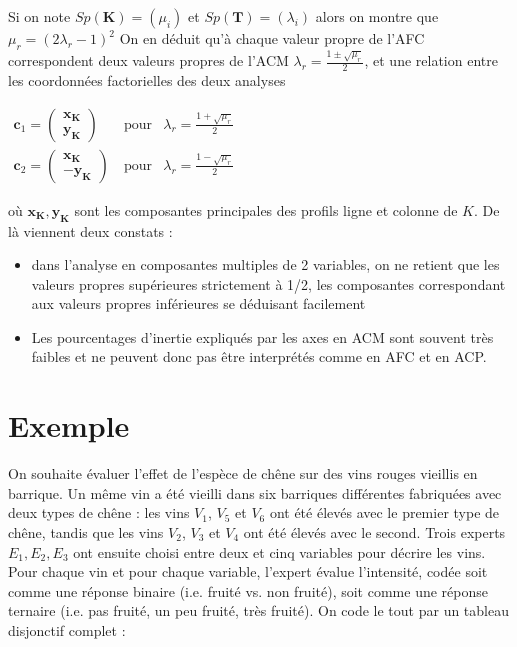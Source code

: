 \documentclass[letterpaper,10pt,english]{jupyterBook}
\begin{document}
\sphinxAtStartPar
Si on note \(Sp(\mathbf{K}) = (\mu_i)\) et \(Sp(\mathbf{T}) = (\lambda_i)\) alors on montre  que  \(\mu_r = (2\lambda_r - 1)^2\)
On en déduit qu’à chaque valeur  propre de l’AFC correspondent deux valeurs propres de l’ACM \(\lambda_r = \frac{1\pm \sqrt{\mu_r}}{2}\), et une relation entre les coordonnées factorielles des deux analyses

\sphinxAtStartPar
\(\begin{eqnarray*}
\mathbf{c}_1 = \begin{pmatrix} \mathbf{x_K}\\\mathbf{y_K}\end{pmatrix}\ &\textrm{pour}& \lambda_r = \frac{1+ \sqrt{\mu_r}}{2}\\
\mathbf{c}_2 = \begin{pmatrix} \mathbf{x_K}\\-\mathbf{y_K}\end{pmatrix}\ &\textrm{pour}& \lambda_r = \frac{1- \sqrt{\mu_r}}{2}
\end{eqnarray*}\)

\sphinxAtStartPar
où \(\mathbf{x_K},\mathbf{y_K}\) sont les composantes principales des profils ligne et colonne de \(K\).
De là viennent deux constats :
\begin{itemize}
\item {} 
\sphinxAtStartPar
dans l’analyse en composantes multiples de 2 variables, on ne retient que les valeurs propres supérieures strictement à 1/2, les composantes correspondant  aux valeurs propres inférieures se déduisant facilement

\item {} 
\sphinxAtStartPar
Les pourcentages d’inertie expliqués par les axes en ACM sont souvent très faibles et
ne peuvent donc pas être interprétés comme en AFC et en ACP.

\end{itemize}


\section{Exemple}
\label{\detokenize{acm:exemple}}
\sphinxAtStartPar
On souhaite évaluer l’effet de l’espèce de chêne sur des vins rouges vieillis en barrique. Un même vin a été vieilli dans six barriques différentes fabriquées avec deux types de chêne : les vins \(V_1\), \(V_5\) et \(V_6\) ont été élevés avec le premier type de chêne, tandis que les vins \(V_2\), \(V_3\) et \(V_4\) ont été élevés avec le second. Trois experts \(E_1,E_2,E_3\) ont ensuite choisi entre deux et cinq variables pour décrire les vins. Pour chaque vin et pour chaque variable, l’expert évalue l’intensité, codée soit comme une réponse binaire (i.e. fruité vs. non fruité), soit comme une réponse ternaire (i.e. pas fruité, un peu fruité, très fruité). On code le tout par un tableau disjonctif complet :
\end{document}

